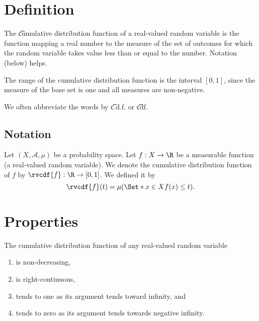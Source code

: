 

\section*{Definition}

The \t{cumulative distribution function} of a real-valued random variable is the function mapping a real number to the measure of the set of outcomes for which the random variable takes value less than or equal to the number.
Notation (below) helps.

The range of the cumulative distribution function is the interval $[0, 1]$, since the measure of the base set is one and all measures are non-negative.

We often abbreviate the words  by \t{c.d.f.} or \t{cdf}.

\subsection*{Notation}

Let $(X, \mathcal{A} , \mu )$ be a probability space.
Let $f: X \to \R $ be a measurable function (a real-valued random variable).
We denote the cumulative distribution function of $f$ by $\rvcdf{f}: \R  \to [0, 1]$.
We defined it by
    \[
\rvcdf{f}(t) = \mu (\Set*{x \in X}{f(x) \leq t}).
    \]

\section*{Properties}

\begin{proposition}
The cumulative distribution function of any real-valued random variable
  \begin{enumerate}
    \item is non-decreasing,
    \item is right-continuous,
    \item tends to one as its argument tends toward infinity, and
    \item tends to zero as its argument tends towards negative infinity.
  \end{enumerate}\end{proposition}
\blankpage